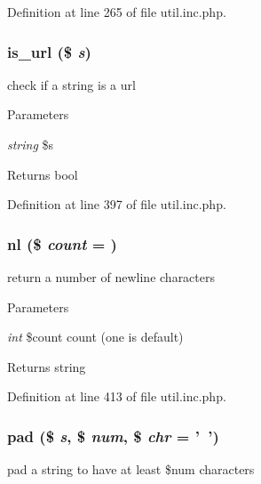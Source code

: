 Definition at line 265 of file util.inc.php.

\hypertarget{util_8inc_8php_a0da48011cb68c039aec396c23cb04295}{
\subsubsection[{is\_\-url}]{\setlength{\rightskip}{0pt plus 5cm}is\_\-url (\$ {\em s})}}
\label{util_8inc_8php_a0da48011cb68c039aec396c23cb04295}
check if a string is a url


\begin{DoxyParams}{Parameters}
\item[{\em string}]\$s \end{DoxyParams}
\begin{DoxyReturn}{Returns}
bool 
\end{DoxyReturn}


Definition at line 397 of file util.inc.php.

\hypertarget{util_8inc_8php_a9f9eeab2eb9a39518e80609fc7f83842}{
\subsubsection[{nl}]{\setlength{\rightskip}{0pt plus 5cm}nl (\$ {\em count} = {})}}
\label{util_8inc_8php_a9f9eeab2eb9a39518e80609fc7f83842}
return a number of newline characters


\begin{DoxyParams}{Parameters}
\item[{\em int}]\$count count (one is default) \end{DoxyParams}
\begin{DoxyReturn}{Returns}
string 
\end{DoxyReturn}


Definition at line 413 of file util.inc.php.

\hypertarget{util_8inc_8php_a37ef346387afe0af2cf86a8bea887173}{
\subsubsection[{pad}]{\setlength{\rightskip}{0pt plus 5cm}pad (\$ {\em s}, \/  \$ {\em num}, \/  \$ {\em chr} = {\ttfamily '~'})}}
\label{util_8inc_8php_a37ef346387afe0af2cf86a8bea887173}
pad a string to have at least \$num characters


